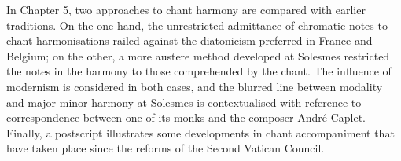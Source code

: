 In Chapter 5, two approaches to chant harmony are compared with earlier traditions.
On the one hand, the unrestricted admittance of chromatic notes to chant harmonisations railed against the diatonicism preferred in France and Belgium; on the other, a more austere method developed at Solesmes restricted the notes in the harmony to those comprehended by the chant.
The influence of modernism is considered in both cases, and the blurred line between modality and major-minor harmony at Solesmes is contextualised with reference to correspondence between one of its monks and the composer André Caplet.
Finally, a postscript illustrates some developments in chant accompaniment that have taken place since the reforms of the Second Vatican Council.
